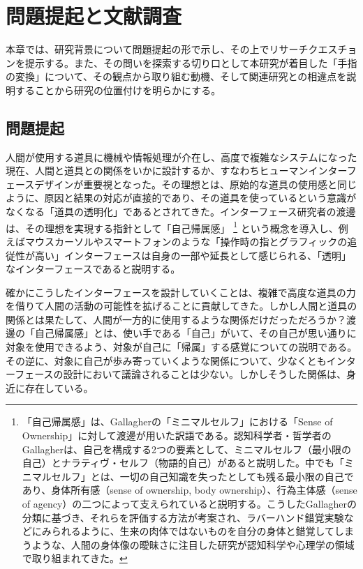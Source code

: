 \chapter{問題提起と文献調査}
\label{related_works}

本章では、研究背景について問題提起の形で示し、その上でリサーチクエスチョンを提示する。また、その問いを探索する切り口として本研究が着目した「手指の変換」について、その観点から取り組む動機、そして関連研究との相違点を説明することから研究の位置付けを明らかにする。

\section{問題提起}
\label{subject}
人間が使用する道具に機械や情報処理が介在し、高度で複雑なシステムになった現在、人間と道具との関係をいかに設計するか、すなわちヒューマンインターフェースデザインが重要視となった。その理想とは、原始的な道具の使用感と同じように、原因と結果の対応が直接的であり、その道具を使っているという意識がなくなる「道具の透明化」であるとされてきた\cite{Watanabe2017}。インターフェース研究者の渡邊は、その理想を実現する指針として「自己帰属感」
\footnote{「自己帰属感」は、Gallagherの「ミニマルセルフ」における「Sense of Ownership」に対して渡邊が用いた訳語である\cite{Watanabe2017}。認知科学者・哲学者のGallagherは、自己を構成する2つの要素として、ミニマルセルフ（最小限の自己）とナラティヴ・セルフ（物語的自己）があると説明した\cite{Gallagher2000}。中でも「ミニマルセルフ」とは、一切の自己知識を失ったとしても残る最小限の自己であり、身体所有感（sense of ownership, body ownership）、行為主体感（sense of agency）の二つによって支えられていると説明する。こうしたGallagherの分類に基づき、それらを評価する方法が考案され、ラバーハンド錯覚実験などにみられるように、生来の肉体ではないものを自分の身体と錯覚してしまうような、人間の身体像の曖昧さに注目した研究が認知科学や心理学の領域で取り組まれてきた。}
という概念を導入し、例えばマウスカーソルやスマートフォンのような「操作時の指とグラフィックの追従性が高い」インターフェースは自身の一部や延長として感じられる、「透明」なインターフェースであると説明する。

確かにこうしたインターフェースを設計していくことは、複雑で高度な道具の力を借りて人間の活動の可能性を拡げることに貢献してきた。しかし人間と道具の関係とは果たして、人間が一方的に使用するような関係だけだっただろうか？渡邊の「自己帰属感」とは、使い手である「自己」がいて、その自己が思い通りに対象を使用できるよう、対象が自己に「帰属」する感覚についての説明である。その逆に、対象に自己が歩み寄っていくような関係について、少なくともインターフェースの設計において議論されることは少ない。しかしそうした関係は、身近に存在している。

